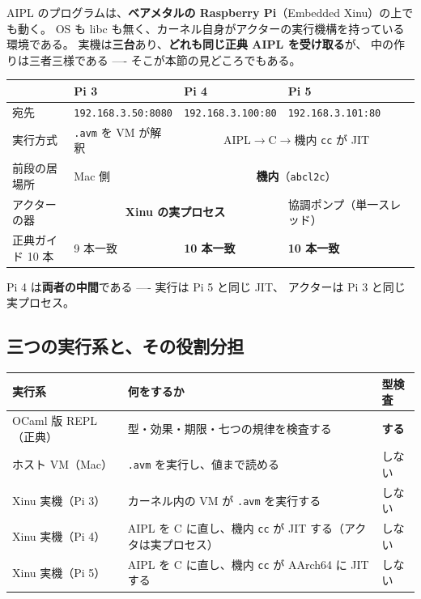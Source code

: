 \documentclass[11pt,a4paper]{ltjsarticle}
\begin{document}
AIPL のプログラムは、\textbf{ベアメタルの Raspberry Pi}（Embedded Xinu）の上でも動く。
OS も libc も無く、カーネル自身がアクターの実行機構を持っている環境である。
実機は\textbf{三台}あり、\textbf{どれも同じ正典 AIPL を受け取る}が、
中の作りは三者三様である ---- そこが本節の見どころでもある。

\begin{center}
\small
\begin{tabular}{@{}llll@{}}
\toprule
 & Pi 3 & Pi 4 & Pi 5 \\
\midrule
宛先 & \texttt{192.168.3.50:8080} & \texttt{192.168.3.100:80} & \texttt{192.168.3.101:80} \\
実行方式 & \texttt{.avm} を VM が解釈 & \multicolumn{2}{c}{AIPL$\to$C$\to$機内 \texttt{cc} が JIT} \\
前段の居場所 & Mac 側 & \multicolumn{2}{c}{\textbf{機内}（\texttt{abcl2c}）} \\
アクターの器 & \multicolumn{2}{c}{\textbf{Xinu の実プロセス}} & 協調ポンプ（単一スレッド） \\
正典ガイド 10 本 & 9 本一致 & \textbf{10 本一致} & \textbf{10 本一致} \\
\bottomrule
\end{tabular}
\end{center}

Pi 4 は\textbf{両者の中間}である ---- 実行は Pi 5 と同じ JIT、
アクターは Pi 3 と同じ実プロセス。

\subsection{三つの実行系と、その役割分担}

\begin{center}
\small
\begin{tabular}{@{}lll@{}}
\toprule
実行系 & 何をするか & 型検査 \\
\midrule
OCaml 版 REPL（正典） & 型・効果・期限・七つの規律を検査する & \textbf{する} \\
ホスト VM（Mac） & \texttt{.avm} を実行し、値まで読める & しない \\
Xinu 実機（Pi 3） & カーネル内の VM が \texttt{.avm} を実行する & しない \\
Xinu 実機（Pi 4） & AIPL を C に直し、機内 \texttt{cc} が JIT する（アクタは実プロセス） & しない \\
Xinu 実機（Pi 5） & AIPL を C に直し、機内 \texttt{cc} が AArch64 に JIT する & しない \\
\bottomrule
\end{tabular}
\end{center}
\end{document}
